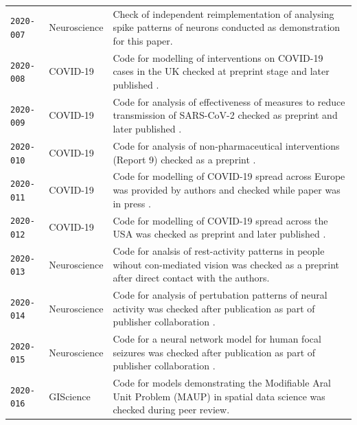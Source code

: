 \documentclass[12pt]{article}
\begin{document}
\begin{table}
\begin{tabular}{llp{12cm}}
    \texttt{2020-007}  \cite{cert-2020-007} & Neuroscience & Check of independent reimplementation of analysing spike patterns of neurons \cite{hathway_re_2018} conducted as demonstration for this paper. \\
    \texttt{2020-008}  \cite{cert-2020-008} & COVID-19 & Code for modelling of interventions on COVID-19 cases in the UK checked at preprint stage \cite{davies-preprint-2020} and later published \cite{Davies2020-vj}. \\
    \texttt{2020-009}  \cite{cert-2020-009} & COVID-19 & Code for analysis of effectiveness of measures to reduce transmission of SARS-CoV-2 checked as preprint \cite{kucharski-preprint-2020} and later published \cite{kucharski_effectiveness_2020}. \\ %
    \texttt{2020-010}  \cite{cert-2020-010} & COVID-19 & Code for analysis of non-pharmaceutical interventions (Report 9) checked as a preprint \cite{ferguson_report_2020}. \\ %
    \texttt{2020-011}  \cite{cert-2020-011} & COVID-19 & Code for modelling of COVID-19 spread across Europe was provided by authors and checked while paper was in press \cite{flaxman_estimating_2020}. \\
    \texttt{2020-012}  \cite{cert-2020-012} & COVID-19 & Code for modelling of COVID-19 spread across the USA was checked as preprint \cite{unwin_report_2020} and later published \cite{unwin_state-level_2020}. \\
    \texttt{2020-013}  \cite{cert-2020-013} & Neuroscience & Code for analsis of rest-activity patterns in people wihout con-mediated vision was checked as a preprint \cite{Spitschan2020.06.02.129502} after direct contact with the authors. \\ %
    \texttt{2020-014}  \cite{cert-2020-014} & Neuroscience & Code for analysis of pertubation patterns of neural activity was checked after publication as part of publisher collaboration \cite{Sadeh2020}. \\ %
    \texttt{2020-015}  \cite{cert-2020-015} & Neuroscience & Code for a neural network model for human focal seizures was checked after publication as part of publisher collaboration \cite{Liou2020}. \\ %
    \texttt{2020-016}  \cite{cert-2020-016} & GIScience & Code for models demonstrating the Modifiable Aral Unit Problem (MAUP) in spatial data science \cite{Brunsdon2020} was checked during peer review. \\ %

\end{tabular}
\end{table}
\end{document}
